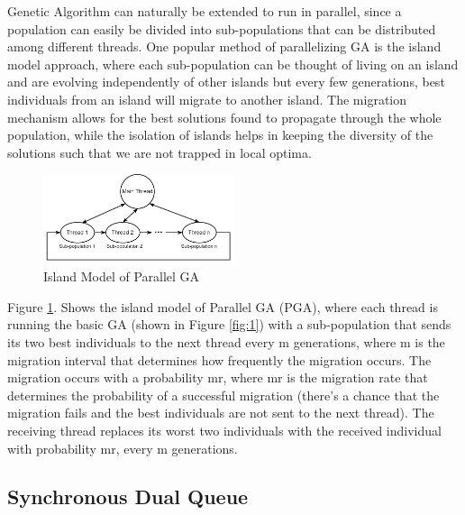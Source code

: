 \documentclass[10pt,journal,compsoc]{IEEEtran}
\begin{document}
Genetic Algorithm can naturally be extended to run in parallel, since a population can easily be divided into sub-populations that can be distributed among different threads. One popular method of parallelizing GA is the island model approach, where each sub-population can be thought of living on an island and are evolving independently of other islands but every few generations, best individuals from an island will migrate to another island. The migration mechanism allows for the best solutions found to propagate through the whole population, while the isolation of islands helps in keeping the diversity of the solutions such that we are not trapped in local optima.\\
\begin{figure}
    \centering
    \includegraphics[width=0.5\textwidth]{png/03.png}
    \caption{Island Model of Parallel GA}
    \label{fig:3}
\end{figure}
Figure \ref{fig:3}. Shows the island model of Parallel GA (PGA), where each thread is running the basic GA (shown in Figure \ref{fig:1}) with a sub-population that sends its two best individuals to the next thread every m generations, where m is the migration interval that determines how frequently the migration occurs. The migration occurs with a probability mr, where mr is the migration rate that determines the probability of a successful migration (there’s a chance that the migration fails and the best individuals are not sent to the next thread). The receiving thread replaces its worst two individuals with the received individual with probability mr, every m generations.


\subsection{Synchronous Dual Queue}
\end{document}
